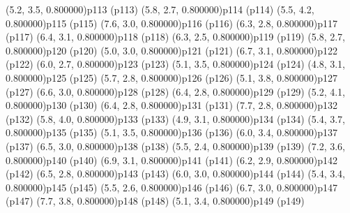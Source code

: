 \psPoint(5.2, 3.5, 0.800000){p113}
\psdot(p113)
\psPoint(5.8, 2.7, 0.800000){p114}
\psdot(p114)
\psPoint(5.5, 4.2, 0.800000){p115}
\psdot(p115)
\psPoint(7.6, 3.0, 0.800000){p116}
\psdot(p116)
\psPoint(6.3, 2.8, 0.800000){p117}
\psdot(p117)
\psPoint(6.4, 3.1, 0.800000){p118}
\psdot(p118)
\psPoint(6.3, 2.5, 0.800000){p119}
\psdot(p119)
\psPoint(5.8, 2.7, 0.800000){p120}
\psdot(p120)
\psPoint(5.0, 3.0, 0.800000){p121}
\psdot(p121)
\psPoint(6.7, 3.1, 0.800000){p122}
\psdot(p122)
\psPoint(6.0, 2.7, 0.800000){p123}
\psdot(p123)
\psPoint(5.1, 3.5, 0.800000){p124}
\psdot(p124)
\psPoint(4.8, 3.1, 0.800000){p125}
\psdot(p125)
\psPoint(5.7, 2.8, 0.800000){p126}
\psdot(p126)
\psPoint(5.1, 3.8, 0.800000){p127}
\psdot(p127)
\psPoint(6.6, 3.0, 0.800000){p128}
\psdot(p128)
\psPoint(6.4, 2.8, 0.800000){p129}
\psdot(p129)
\psPoint(5.2, 4.1, 0.800000){p130}
\psdot(p130)
\psPoint(6.4, 2.8, 0.800000){p131}
\psdot(p131)
\psPoint(7.7, 2.8, 0.800000){p132}
\psdot(p132)
\psPoint(5.8, 4.0, 0.800000){p133}
\psdot(p133)
\psPoint(4.9, 3.1, 0.800000){p134}
\psdot(p134)
\psPoint(5.4, 3.7, 0.800000){p135}
\psdot(p135)
\psPoint(5.1, 3.5, 0.800000){p136}
\psdot(p136)
\psPoint(6.0, 3.4, 0.800000){p137}
\psdot(p137)
\psPoint(6.5, 3.0, 0.800000){p138}
\psdot(p138)
\psPoint(5.5, 2.4, 0.800000){p139}
\psdot(p139)
\psPoint(7.2, 3.6, 0.800000){p140}
\psdot(p140)
\psPoint(6.9, 3.1, 0.800000){p141}
\psdot(p141)
\psPoint(6.2, 2.9, 0.800000){p142}
\psdot(p142)
\psPoint(6.5, 2.8, 0.800000){p143}
\psdot(p143)
\psPoint(6.0, 3.0, 0.800000){p144}
\psdot(p144)
\psPoint(5.4, 3.4, 0.800000){p145}
\psdot(p145)
\psPoint(5.5, 2.6, 0.800000){p146}
\psdot(p146)
\psPoint(6.7, 3.0, 0.800000){p147}
\psdot(p147)
\psPoint(7.7, 3.8, 0.800000){p148}
\psdot(p148)
\psPoint(5.1, 3.4, 0.800000){p149}
\psdot(p149)
